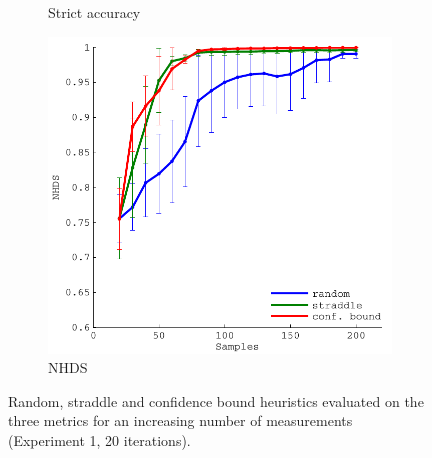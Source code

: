 \documentclass[11pt]{article} %
\begin{document}
\begin{figure}[tb]
\begin{subfigure}[b]{0.329\textwidth}
    \caption{Strict accuracy}
  \end{subfigure}
  \hfill
  \begin{subfigure}[b]{0.329\textwidth}
    \centering
    \includegraphics[width=\textwidth]{figures/sin2d_hd}
    \caption{NHDS}
  \end{subfigure}
  \caption{Random, straddle and confidence bound heuristics evaluated on the three
           metrics for an increasing number of measurements
           (Experiment 1, 20 iterations).}
  \label{fig:sin2d_eval}
\end{figure}
\end{document}
